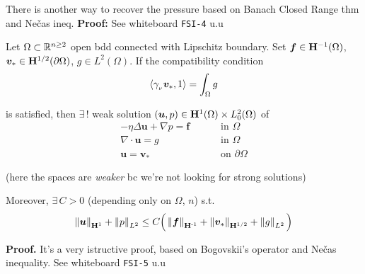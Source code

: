 \smallskip

There is another way to recover the pressure based on Banach Closed Range thm and Nečas ineq. \textbf{\color{lavender(floral)}Proof:} See whiteboard \texttt{FSI-4} u.u

\noindent\rlap{\rule[1.5ex]{0.495\textwidth}{.2pt}}

\vspace{-0.5em}


Let $\Omega\subset\mathbb{R}^{n\geq 2}$ open bdd connected with Lipschitz boundary. Set $\bm f\in\mathbf{H}^{-1}(\Omega)$, $\bm v_*\in \mathbf{H}^{1/2}(\partial\Omega)$, $g\in L^2(\Omega)$. If the compatibility condition
\begin{equation*}
\left\langle \gamma_{_\nu}\bm v_*,1 \right\rangle=\int_\Omega g
\end{equation*}

is satisfied, then $\exists\,!$ weak solution $(\bm u,p)\in \mathbf{H}^1(\Omega)\times L^2_0(\Omega)$ of
\begin{align*}[left=\empheqlbrace]
-\eta\Delta \bm u +\nabla p = \bm f &\qquad\text{ in }\Omega \nonumber \\
\nabla\cdot \bm u=g &\qquad\text{ in }\Omega \nonumber \\
\bm u=\bm v_* &\qquad\text{ on }\partial\Omega \nonumber
\end{align*}

(here the spaces are \emph{weaker} bc we're not looking for strong solutions)

\smallskip

Moreover, $\exists\,C>0$ (depending only on $\Omega$, $n$) s.t.
\begin{equation*}
\left\lVert \bm u \right\rVert_{\mathbf{H}^1}+\left\lVert p \right\rVert_{L^2}\leq C \Big( \left\lVert \bm f \right\rVert_{\mathbf{H}^{\text{-}1}}+\left\lVert \bm v_* \right\rVert_{\mathbf{H}^{1/2}} + \left\lVert g \right\rVert_{L^2} \Big)
\end{equation*}

\textbf{\color{lavender(floral)}Proof.} It's a very istructive proof, based on Bogovskii's operator and Nečas inequality. See whiteboard \texttt{FSI-5} u.u

\noindent\rlap{\rule[1.5ex]{0.495\textwidth}{.2pt}}

\newpage



